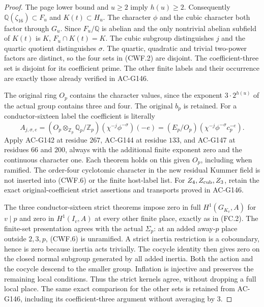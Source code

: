 \begin{proof}
The page lower bound and $u\geq2$ imply $h(u)\geq2$.
Consequently $\mathbb Q(\zeta_{16})\subset F_u$ and
$K(t)\subset H_u$.  The character $\phi$ and the cubic character
both factor through $G_u$.  Since $F_u/\mathbb Q$ is abelian
and the only nontrivial abelian subfield of $K(t)$ is $K$,
$F_u\cap K(t)=K$.  The cubic subgroup distinguishes $j$ and
the quartic quotient distinguishes $\sigma$.
The quartic, quadratic and trivial two-power factors are distinct,
so the four sets in (CWF.2) are disjoint.  The coefficient-three
set is disjoint for its coefficient prime.  The other finite labels
and their occurrence are exactly those already verified in AC-G146.

The original ring $O_p$ contains the character values, since
the exponent $3\cdot2^{h(u)}$ of the actual group contains
three and four.  The original $b_p$ is retained.
For a conductor-sixteen label the coefficient is literally
\[
 A_{j,\sigma,e}=(O_p\otimes_{\mathbb Z_p}\mathbb Q_p/\mathbb Z_p)
              (\chi^{-j}\phi^{-\sigma})(-e)
       =(E_p/O_p)(\chi^{-j}\phi^{-\sigma}c_p^{-e}).
 \tag{CWF.6}
\]
Apply AC-G142 at residue $267$, AC-G144 at residue $133$,
and AC-G147 at residues $66$ and $200$, always with the additional
finite exponent zero and the continuous character one.
Each theorem holds on this given $O_p$, including when ramified.
The order-four cyclotomic character in the new residual Kummer
field is not inserted into (CWF.6) or the finite host-label list.
For $Z_4,Z_{\rm cub},Z_3$, retain the exact original-coefficient
strict assertions and transports proved in AC-G146.

The three conductor-sixteen strict theorems impose zero in full
$H^1(G_{K_v},A)$ for $v\mid p$ and zero in $H^1(I_v,A)$ at
every other finite place, exactly as in (FC.2).
The finite-set presentation agrees with the actual $\Sigma_p$:
at an added away-$p$ place outside $2,3,p$, (CWF.6) is unramified.
A strict inertia restriction is a coboundary, hence is zero
because inertia acts trivially.  The cocycle identity then gives
zero on the closed normal subgroup generated by all added inertia.
Both the action and the cocycle descend to the smaller group.
Inflation is injective and preserves the remaining local conditions.
Thus the strict kernels agree, without dropping a full local place.
The same exact comparison for the other sets is retained from AC-G146,
including its coefficient-three argument without averaging by $3$.


\end{proof}
